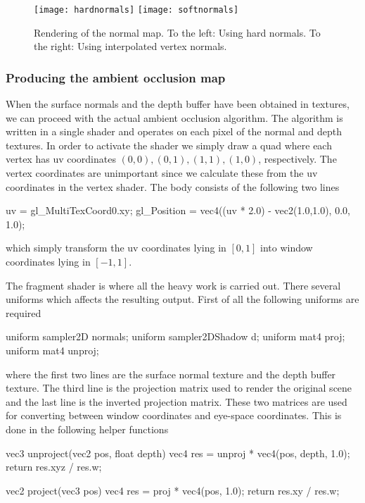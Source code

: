 \begin{figure}[h]
  \centering
  \texttt{[image: hardnormals]}
  \texttt{[image: softnormals]}
  \caption{Rendering of the normal map. To the left: Using hard
    normals. To the right: Using interpolated vertex normals.}
  \label{fig:normals}
\end{figure}
\subsubsection*{Producing the ambient occlusion map}  
When the surface normals and the depth buffer have been obtained in
textures, we can proceed with the actual ambient occlusion
algorithm. The algorithm is written in a single shader and operates on
each pixel of the normal and depth textures. In order to activate the
shader we simply draw a quad where each vertex has uv coordinates
$(0,0), (0,1), (1,1), (1,0)$, respectively. The vertex coordinates are
unimportant since we calculate these from the uv coordinates in the
vertex shader. The body consists of the following two lines
\begin{cppcode}
  uv = gl_MultiTexCoord0.xy;
  gl_Position = vec4((uv * 2.0) - vec2(1.0,1.0), 0.0, 1.0);
\end{cppcode}
which simply transform the uv coordinates lying in $[0,1]$ into window
coordinates lying in $[-1,1]$.

The fragment shader is where all the heavy work is carried out. There
several uniforms which affects the resulting output. First of all the
following uniforms are required
\begin{cppcode}
  uniform sampler2D normals;
  uniform sampler2DShadow d;
  uniform mat4 proj;
  uniform mat4 unproj;
\end{cppcode}
where the first two lines are the surface normal texture and the depth
buffer texture. The third line is the projection matrix used to render
the original scene and the last line is the inverted projection
matrix. These two matrices are used for converting between window
coordinates and eye-space coordinates. This is done in the following
helper functions
\begin{cppcode}
  vec3 unproject(vec2 pos, float depth) {
    vec4 res = unproj * vec4(pos, depth, 1.0);
    return res.xyz / res.w;
  }
  
  vec2 project(vec3 pos) {
    vec4 res = proj * vec4(pos, 1.0);
    return res.xy / res.w;
  }
\end{cppcode}


